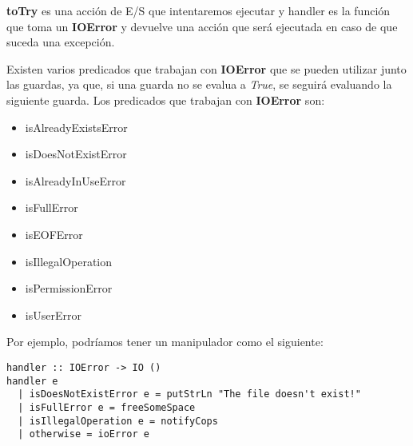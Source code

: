 \textbf{toTry} es una acción de E/S que intentaremos ejecutar y handler es la función que toma un \textbf{IOError} y devuelve una acción que será ejecutada en caso de que suceda una excepción.

Existen varios predicados que trabajan con \textbf{IOError} que se pueden utilizar junto las guardas, ya que, si una guarda no se evalua a \textit{True}, se seguirá evaluando la siguiente guarda. Los predicados que trabajan con \textbf{IOError} son:

\begin{itemize}
  \item isAlreadyExistsError
  \item isDoesNotExistError
  \item isAlreadyInUseError
  \item isFullError
  \item isEOFError
  \item isIllegalOperation
  \item isPermissionError
  \item isUserError
\end{itemize}

Por ejemplo, podríamos tener un manipulador como el siguiente:

\begin{lstlisting}
handler :: IOError -> IO ()
handler e
  | isDoesNotExistError e = putStrLn "The file doesn't exist!"
  | isFullError e = freeSomeSpace
  | isIllegalOperation e = notifyCops
  | otherwise = ioError e
\end{lstlisting}


